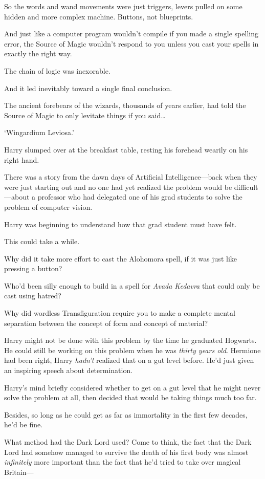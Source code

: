So the words and wand movements were just triggers, levers pulled on some hidden and more complex machine. Buttons, not blueprints.

And just like a computer program wouldn't compile if you made a single spelling error, the Source of Magic wouldn't respond to you unless you cast your spells in exactly the right way.

The chain of logic was inexorable.

And it led inevitably toward a single final conclusion.

The ancient forebears of the wizards, thousands of years earlier, had told the Source of Magic to only levitate things if you said{\ldots}

`Wingardium Leviosa.'

Harry slumped over at the breakfast table, resting his forehead wearily on his right hand.

There was a story from the dawn days of Artificial Intelligence—back when they were just starting out and no one had yet realized the problem would be difficult—about a professor who had delegated one of his grad students to solve the problem of computer vision.

Harry was beginning to understand how that grad student must have felt.

This could take a while.

Why did it take more effort to cast the Alohomora spell, if it was just like pressing a button?

Who'd been silly enough to build in a spell for \emph{Avada Kedavra} that could only be cast using hatred?

Why did wordless Transfiguration require you to make a complete mental separation between the concept of form and concept of material?

Harry might not be done with this problem by the time he graduated Hogwarts. He could still be working on this problem when he was \emph{thirty years old}. Hermione had been right, Harry \emph{hadn't} realized that on a gut level before. He'd just given an inspiring speech about determination.

Harry's mind briefly considered whether to get on a gut level that he might never solve the problem at all, then decided that would be taking things much too far.

Besides, so long as he could get as far as immortality in the first few decades, he'd be fine.

What method had the Dark Lord used? Come to think, the fact that the Dark Lord had somehow managed to survive the death of his first body was almost \emph{infinitely} more important than the fact that he'd tried to take over magical Britain—

